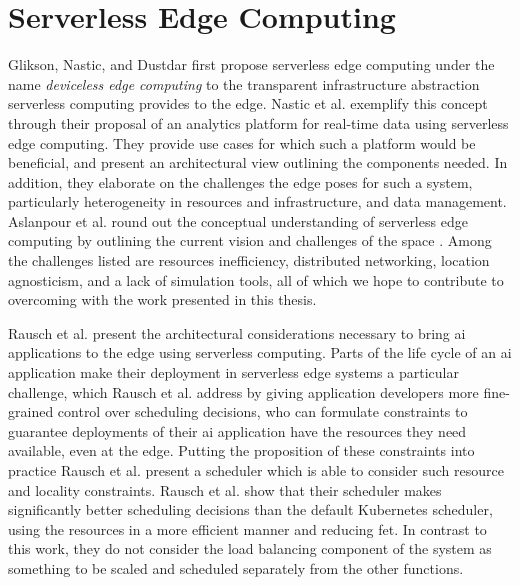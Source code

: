 \section{Serverless Edge Computing}
Glikson, Nastic, and Dustdar first propose serverless edge computing under the name \textit{deviceless edge computing} to the transparent infrastructure abstraction serverless computing provides to the edge\cite{gliksonDevicelessEdgeComputing2017}.
Nastic et al. exemplify this concept through their proposal of an analytics platform for real-time data using serverless edge computing\cite{nasticServerlessRealTimeData2017}.
They provide use cases for which such a platform would be beneficial, and present an architectural view outlining the components needed.
In addition, they elaborate on the challenges the edge poses for such a system, particularly heterogeneity in resources and infrastructure, and data management\cite{nasticServerlessRealTimeData2017}.
Aslanpour et al. round out the conceptual understanding of serverless edge computing by outlining the current vision and challenges of the space \cite{aslanpourServerlessEdgeComputing2021}.
Among the challenges listed are resources inefficiency, distributed networking, location agnosticism, and a lack of simulation tools\cite{aslanpourServerlessEdgeComputing2021}, all of which we hope to contribute to overcoming with the work presented in this thesis.

Rausch et al.\cite{rauschServerlessPlatformEdge} present the architectural considerations necessary to bring \gls{ai} applications to the edge using serverless computing.
Parts of the life cycle of an \gls{ai} application make their deployment in serverless edge systems a particular challenge\cite{aslanpourServerlessEdgeComputing2021}, which Rausch et al. address by giving application developers more fine-grained control over scheduling decisions\cite{rauschServerlessPlatformEdge}, who can formulate constraints to guarantee deployments of their \gls{ai} application have the resources they need available, even at the edge.
Putting the proposition of these constraints into practice Rausch et al. present a scheduler which is able to consider such resource and locality constraints\cite{skippy}.
Rausch et al. show that their scheduler makes significantly better scheduling decisions than the default Kubernetes scheduler, using the resources in a more efficient manner and reducing \gls{fet}\cite{skippy}. In contrast to this work, they do not consider the load balancing component of the system as something to be scaled and scheduled separately from the other functions.

